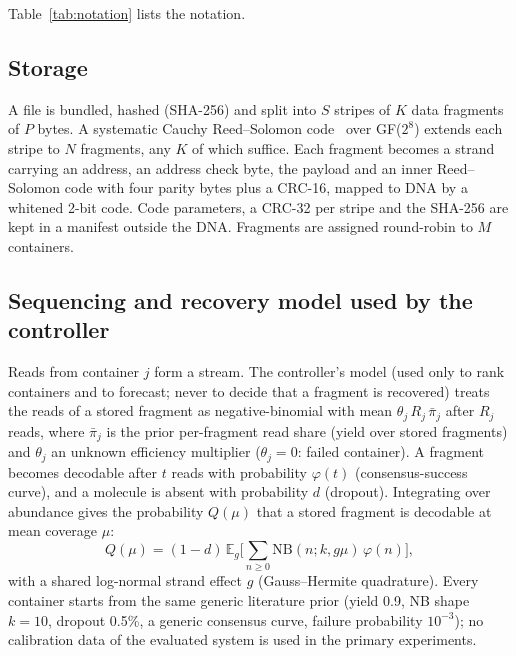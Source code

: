 \documentclass[conference,onecolumn,11pt]{IEEEtran}
\newcommand{\E}{\mathbb{E}}
\begin{document}
Table~\ref{tab:notation} lists the notation.


\subsection{Storage}
A file is bundled, hashed (SHA-256) and split into $S$ stripes of $K$ data fragments of $P$
bytes.  A systematic Cauchy Reed--Solomon code~\cite{reed1960polynomial} over GF($2^8$) extends
each stripe to $N$ fragments, any $K$ of which suffice.  Each fragment becomes a strand carrying
an address, an address check byte, the payload and an inner Reed--Solomon code with four parity
bytes plus a CRC-16, mapped to DNA by a whitened 2-bit code.  Code parameters, a CRC-32 per
stripe and the SHA-256 are kept in a manifest outside the DNA.  Fragments are assigned
round-robin to $M$ containers.

\subsection{Sequencing and recovery model used by the controller}
Reads from container $j$ form a stream.  The controller's model (used only to rank containers
and to forecast; never to decide that a fragment is recovered) treats the reads of a stored
fragment as negative-binomial with mean $\theta_j\,R_j\,\bar\pi_j$ after $R_j$ reads, where
$\bar\pi_j$ is the prior per-fragment read share (yield over stored fragments) and $\theta_j$ an
unknown efficiency multiplier ($\theta_j{=}0$: failed container).  A fragment becomes decodable
after $t$ reads with probability $\varphi(t)$ (consensus-success curve), and a molecule is absent
with probability $d$ (dropout).  Integrating over abundance gives the probability $Q(\mu)$ that a
stored fragment is decodable at mean coverage $\mu$:
\begin{equation}
Q(\mu)=(1-d)\,\E_g\Big[\sum_{n\ge0}\mathrm{NB}(n;k,g\mu)\,\varphi(n)\Big],
\label{eq:Q}
\end{equation}
with a shared log-normal strand effect $g$ (Gauss--Hermite quadrature).  Every container starts
from the same generic literature prior (yield 0.9, NB shape $k{=}10$, dropout 0.5\%, a generic
consensus curve, failure probability $10^{-3}$); no calibration data of the evaluated system is
used in the primary experiments.
\end{document}
